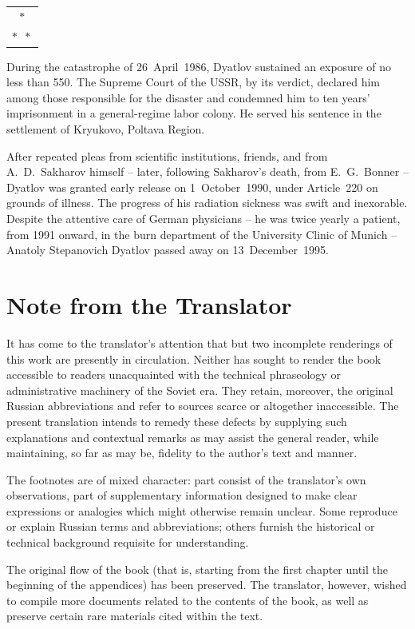 \documentclass[openright]{bookest}
\newcommand{\varthreestars}{\begin{center}\begin{tabular}{c}$\ast$\\[-0.8ex] $\ast\enspace \ast $\end{tabular}\end{center}}
\begin{document}
\varthreestars

During the catastrophe of 26~April~1986, Dyatlov sustained an exposure of no less than \qty{550}{\rem}. The Supreme Court of the USSR, by its verdict, declared him among those responsible for the disaster and condemned him to ten years' imprisonment in a general-regime labor colony. He served his sentence in the settlement of Kryukovo, Poltava Region.

After repeated pleas from scientific institutions, friends, and from A.~D.~Sakharov himself -- later, following Sakharov's death, from E.~G.~Bonner -- Dyatlov was granted early release on 1~October~1990, under Article~220 on grounds of illness. The progress of his radiation sickness was swift and inexorable. Despite the attentive care of German physicians -- he was twice yearly a patient, from 1991 onward, in the burn department of the University Clinic of Munich -- Anatoly Stepanovich Dyatlov passed away on 13~December~1995.

\chapter*{Note from the Translator}
It has come to the translator's attention that but two incomplete renderings of this work are presently in circulation. Neither has sought to render the book accessible to readers unacquainted with the technical phraseology or administrative machinery of the Soviet era. They retain, moreover, the original Russian abbreviations and refer to sources scarce or altogether inaccessible. The present translation intends to remedy these defects by supplying such explanations and contextual remarks as may assist the general reader, while maintaining, so far as may be, fidelity to the author's text and manner.

The footnotes are of mixed character: part consist of the translator's own observations, part of supplementary information designed to make clear expressions or analogies which might otherwise remain unclear. Some reproduce or explain Russian terms and abbreviations; others furnish the historical or technical background requisite for understanding.

The original flow of the book (that is, starting from the first chapter until the beginning of the appendices) has been preserved. The translator, however, wished to compile more documents related to the contents of the book, as well as preserve certain rare materials cited within the text.
\end{document}
